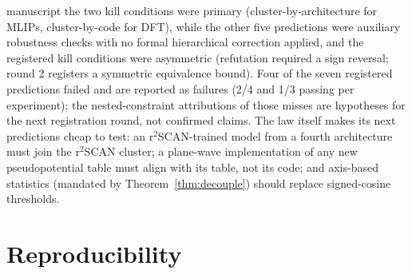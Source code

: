 \documentclass[11pt]{article}
\theoremstyle{remark}
\begin{document}
manuscript the two kill conditions were primary (cluster-by-architecture for
MLIPs, cluster-by-code for DFT), while the other five predictions were
auxiliary robustness checks with no formal hierarchical correction applied, and the registered
kill conditions were asymmetric (refutation required a sign reversal;
round 2 registers a symmetric equivalence bound). Four of the seven
registered predictions failed and are reported as failures (2/4 and 1/3
passing per experiment); the nested-constraint attributions of those misses
are hypotheses for the next registration round, not confirmed claims. The law
itself makes its next predictions cheap to test: an r$^2$SCAN-trained model
from a fourth architecture must join the r$^2$SCAN cluster; a plane-wave
implementation of any new pseudopotential table must align with its table,
not its code; and axis-based statistics (mandated by
Theorem~\ref{thm:decouple}) should replace signed-cosine thresholds.

\section{Reproducibility}
\label{sec:repro}
\end{document}
